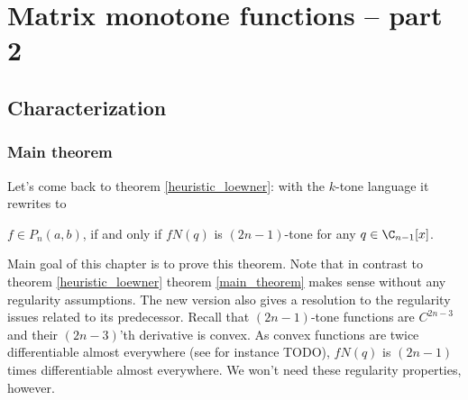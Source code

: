 \chapter{Matrix monotone functions -- part 2}

\section{Characterization}

\subsection{Main theorem}

Let's come back to theorem \ref{heuristic_loewner}: with the $k$-tone language it rewrites to

\begin{lause}\label{main_theorem}
	$f \in P_{n}(a, b)$, if and only if $f N(q)$ is $(2 n - 1)$-tone for any $q \in \C_{n - 1}[x]$.
\end{lause}

Main goal of this chapter is to prove this theorem. Note that in contrast to theorem \ref{heuristic_loewner} theorem \ref{main_theorem} makes sense without any regularity assumptions. The new version also gives a resolution to the regularity issues related to its predecessor. Recall that $(2 n - 1)$-tone functions are $C^{2 n - 3}$ and their $(2 n - 3)$'th derivative is convex. As convex functions are twice differentiable almost everywhere (see for instance TODO), $f N(q)$ is $(2 n - 1)$ times differentiable almost everywhere. We won't need these regularity properties, however.


